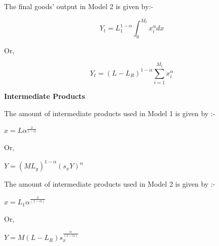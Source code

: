 \documentclass[a4paper, 12pt]{article}
\begin{document}
\begin{flushleft}
	The final goods' output in Model 2 is given by:-
\end{flushleft}
\begin{center}
	$$ Y_t = L_1^{1-\alpha}\int_{0}^{M_t}x_i^{\alpha}dx$$
	\begin{flushleft}
		Or,
	\end{flushleft}
	\begin{center}
		$$Y_t = (L-L_R)^{1-\alpha} \sum_{i=1}^{M_t} x_i^{\alpha} $$
	\end{center}
\end{center}
\newpage
\begin{flushleft}
	\textbf{Intermediate Products}
	\begin{flushleft}
		The amount of intermediate products used in Model 1 is given by :-
	\end{flushleft}
	\begin{center}
		$x = L \alpha ^ \frac {2} {1-\alpha}$
	\end{center}
	\begin{flushleft}
		Or,
	\end{flushleft}
	\begin{center}
		$ Y = (ML_y)^{1-\alpha} (s_x Y)^{\alpha} $
	\end{center}
		\begin{flushleft}
			The amount of intermediate products used in Model 2 is given by :-
		\end{flushleft}
		\begin{center}
			$x = L_1 \alpha ^ {\frac {2} {(1-\alpha)}}$
		\end{center}
		\begin{flushleft}
			Or,
		\end{flushleft}
		\begin{center}
			$ Y = M(L-L_R)s_x^ {\frac{\alpha}{(1-\alpha)}} $
		\end{center}
\end{flushleft}
\newpage
\end{document}
